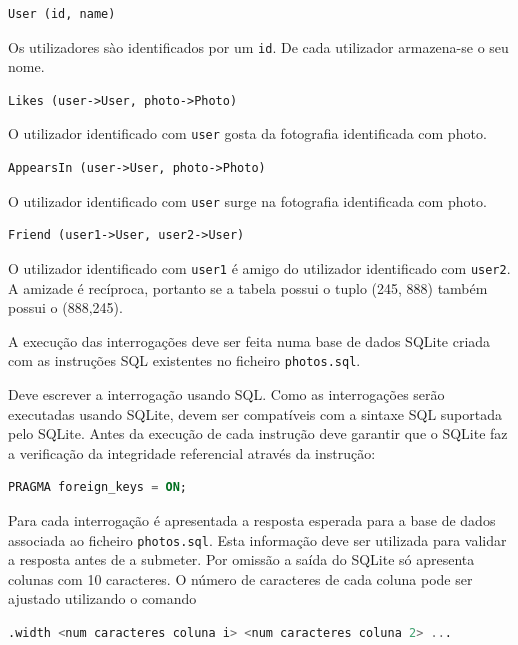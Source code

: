 \documentclass[type=normal, year=2014/15]{bdad_exam}
\begin{document}
{\begin{lstlisting}[numbers=none]
User (id, name)
\end{lstlisting}

Os utilizadores sào identificados por um \texttt{id}. De cada utilizador armazena-se o seu nome.

\begin{lstlisting}[numbers=none]
Likes (user->User, photo->Photo)
\end{lstlisting}

O utilizador identificado com \texttt{user} gosta da fotografia identificada com photo.

\begin{lstlisting}[numbers=none]
AppearsIn (user->User, photo->Photo)
\end{lstlisting}

O utilizador identificado com \texttt{user} surge na fotografia identificada com photo.

\begin{lstlisting}[numbers=none]
Friend (user1->User, user2->User)
\end{lstlisting}

O utilizador identificado com \texttt{user1} é amigo do utilizador identificado com \texttt{user2}. A amizade é recíproca, portanto se a tabela possui o tuplo (245, 888) também possui o (888,245).

A execução das interrogações deve ser feita numa base de dados SQLite criada com as instruções SQL existentes no ficheiro \texttt{photos.sql}.

Deve escrever a interrogação usando SQL. Como as interrogações serão executadas usando SQLite, devem ser compatíveis com a sintaxe SQL suportada pelo SQLite. Antes da execução de cada instrução deve garantir que o SQLite faz a verificação da integridade referencial através da instrução:

\begin{lstlisting}[language=SQL,numbers=none]
PRAGMA foreign_keys = ON;
\end{lstlisting}

Para cada interrogação é apresentada a resposta esperada para a base de dados associada ao ficheiro \texttt{photos.sql}. Esta informação deve ser utilizada para validar a resposta antes de a submeter. Por omissão a saída do SQLite só apresenta colunas com 10 caracteres. O número de caracteres de cada coluna pode ser ajustado utilizando o comando

\begin{lstlisting}[language=SQL,numbers=none]
.width <num caracteres coluna i> <num caracteres coluna 2> ...
\end{lstlisting}

}
\end{document}
